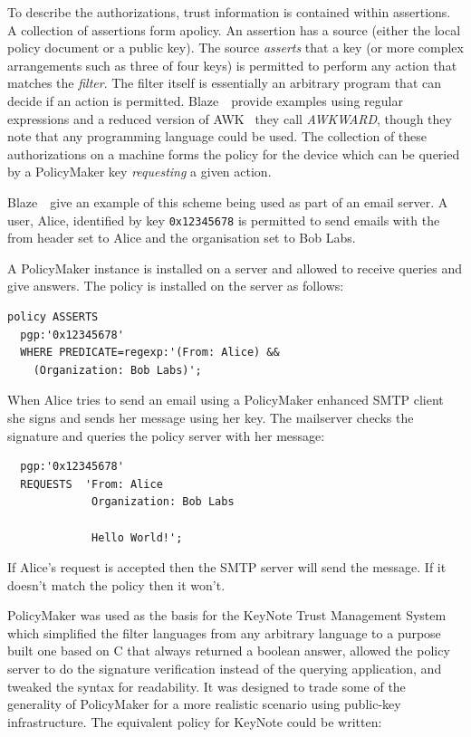 \documentclass[thesis.tex]{subfiles}
\begin{document}
To describe the authorizations, trust information is contained within assertions.
A collection of assertions form apolicy. An assertion has a source (either
the local policy document or a public key). The source \emph{asserts} that a key
(or more complex arrangements such as three of four keys) is permitted to
perform any action that matches the \emph{filter}. The filter itself is
essentially an arbitrary program that can decide if an action is permitted.
Blaze~\etal~provide examples using regular expressions and a reduced version of
AWK~\cite{aho_awk-pattern_1979} they call \emph{AWKWARD}, though they note that
any programming language could be used. The collection of these authorizations
on a machine forms the policy for the device which can be queried by a
PolicyMaker key \emph{requesting} a given action.

Blaze~\etal~give an example of this scheme being used as part of an email
server. A user, Alice, identified by key \texttt{0x12345678} is permitted to
send emails with the from header set to Alice and the organisation set to Bob
Labs.

A PolicyMaker instance is installed on a server and allowed to receive queries and give answers.
The policy is installed on the server as follows:

\begin{lstlisting}
policy ASSERTS
  pgp:'0x12345678'
  WHERE PREDICATE=regexp:'(From: Alice) &&
    (Organization: Bob Labs)';
\end{lstlisting}

When Alice tries to send an email using a PolicyMaker enhanced SMTP
client she signs and sends her message using her key.  The mailserver
checks the signature and queries the policy server with her message:

\begin{lstlisting}
  pgp:'0x12345678'
  REQUESTS  'From: Alice
             Organization: Bob Labs

             Hello World!';
\end{lstlisting}

If Alice's request is accepted then the SMTP server will send the
message.  If it doesn't match the policy then it won't.

PolicyMaker was used as the basis for the KeyNote Trust Management
System~\cite{blaze_role_1999,blaze_keynote:_1998} which simplified the
filter languages from any arbitrary language to a purpose built one
based on C that always returned a boolean answer, allowed the policy
server to do the signature verification instead of the querying
application, and tweaked the syntax for readability.  It was designed
to trade some of the generality of PolicyMaker for a more realistic
scenario using public-key infrastructure.  The equivalent policy for KeyNote could be written:
\end{document}
